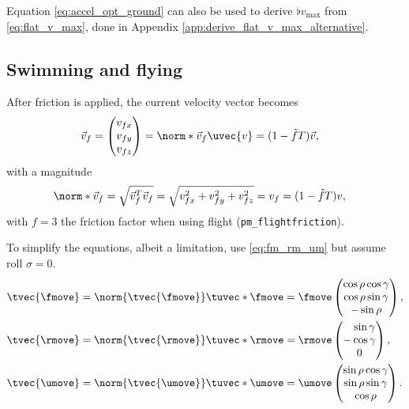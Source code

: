Equation \eqref{eq:accel_opt_ground} can also be used to derive $\flat{v}_{\max}$ from \eqref{eq:flat_v_max}, done in Appendix \ref{app:derive_flat_v_max_alternative}.


\subsection{Swimming and flying}
\label{sec:swim_and_flying}
After friction is applied, the current velocity vector becomes
\begin{align*}
\vec{v}_f &=
\begin{pmatrix}
v_{fx} \\ v_{fy} \\ v_{fz}
\end{pmatrix} = \norm*{\vec{v}_f} \uvec{v} = (1 - \tilde{f}T)\vec{v},
\end{align*}
with a magnitude
\begin{align*}
\norm*{\vec{v}_f} &= \sqrt{\vec{v}_f^T \vec{v}_f} = \sqrt{v_{fx}^2 + v_{fy}^2 + v_{fz}^2} = v_f = (1 - \tilde{f}T)v,
\end{align*}
with $f = 3$ the friction factor when using flight (\texttt{pm\_flightfriction}).

To simplify the equations, albeit a limitation, use \eqref{eq:fm_rm_um} but assume roll $\sigma = 0$.
\begin{align*}
\tvec{\fmove} &= \norm{\tvec{\fmove}} \tuvec*{\fmove} = \fmove
\begin{pmatrix}
\cos\rho\cos\gamma \\ \cos\rho\sin\gamma \\ -\sin\rho
\end{pmatrix},\\
%
\tvec{\rmove} &= \norm{\tvec{\rmove}} \tuvec*{\rmove} = \rmove
\begin{pmatrix}
\hphantom{-}\sin\gamma \\ -\cos\gamma \\ 0
\end{pmatrix},\\
%
\tvec{\umove} &= \norm{\tvec{\umove}} \tuvec*{\umove} = \umove
\begin{pmatrix}
\sin\rho\cos\gamma \\ \sin\rho\sin\gamma \\ \cos\rho
\end{pmatrix}.
\end{align*}

